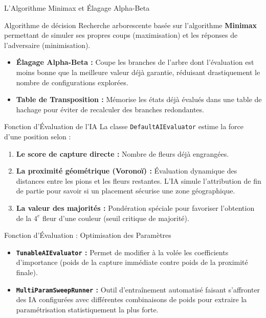 \documentclass{beamer}
\begin{document}
\begin{frame}{L'Algorithme Minimax et Élagage Alpha-Beta}
    \begin{block}{Algorithme de décision}
        Recherche arborescente basée sur l'algorithme \textbf{Minimax} permettant de simuler ses propres coups (maximisation) et les réponses de l'adversaire (minimisation).
    \end{block}
    \begin{itemize}
        \item \textbf{Élagage Alpha-Beta :} Coupe les branches de l'arbre dont l'évaluation est moins bonne que la meilleure valeur déjà garantie, réduisant drastiquement le nombre de configurations explorées.
        \item \textbf{Table de Transposition :} Mémorise les états déjà évalués dans une table de hachage pour éviter de recalculer des branches redondantes.
    \end{itemize}
\end{frame}

\begin{frame}{Fonction d'Évaluation de l'IA}
    La classe \texttt{DefaultAIEvaluator} estime la force d'une position selon :
    \begin{enumerate}
        \item \textbf{Le score de capture directe :} Nombre de fleurs déjà engrangées.
        \item \textbf{La proximité géométrique (Voronoï) :} Évaluation dynamique des distances entre les pions et les fleurs restantes. L'IA simule l'attribution de fin de partie pour savoir si un placement sécurise une zone géographique.
        \item \textbf{La valeur des majorités :} Pondération spéciale pour favoriser l'obtention de la $4^e$ fleur d'une couleur (seuil critique de majorité).
    \end{enumerate}
\end{frame}

\begin{frame}{Fonction d'Évaluation : Optimisation des Paramètres}
    \begin{itemize}
        \item \textbf{\texttt{TunableAIEvaluator} :} Permet de modifier à la volée les coefficients d'importance (poids de la capture immédiate contre poids de la proximité finale).
        \item \textbf{\texttt{MultiParamSweepRunner} :} Outil d'entraînement automatisé faisant s'affronter des IA configurées avec différentes combinaisons de poids pour extraire la paramétrisation statistiquement la plus forte.
    \end{itemize}
\end{frame}
\end{document}
